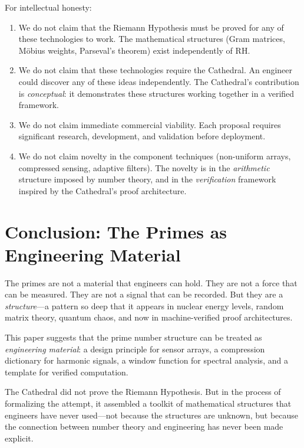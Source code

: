 \documentclass[11pt,a4paper]{article}
\newcommand{\RH}{\ensuremath{\mathrm{RH}}}
\begin{document}
For intellectual honesty:

\begin{enumerate}
  \item We do not claim that the Riemann Hypothesis must be proved
    for any of these technologies to work. The mathematical
    structures (Gram matrices, M\"obius weights, Parseval's theorem)
    exist independently of \RH.
  \item We do not claim that these technologies require the
    Cathedral. An engineer could discover any of these ideas
    independently. The Cathedral's contribution is
    \emph{conceptual}: it demonstrates these structures working
    together in a verified framework.
  \item We do not claim immediate commercial viability. Each
    proposal requires significant research, development, and
    validation before deployment.
  \item We do not claim novelty in the component techniques
    (non-uniform arrays, compressed sensing, adaptive filters).
    The novelty is in the \emph{arithmetic} structure imposed by
    number theory, and in the \emph{verification} framework
    inspired by the Cathedral's proof architecture.
\end{enumerate}

\section{Conclusion: The Primes as Engineering Material}

The primes are not a material that engineers can hold. They are not
a force that can be measured. They are not a signal that can be
recorded. But they are a \emph{structure}---a pattern so deep that
it appears in nuclear energy levels, random matrix theory, quantum
chaos, and now in machine-verified proof architectures.

This paper suggests that the prime number structure can be treated
as \emph{engineering material}: a design principle for sensor
arrays, a compression dictionary for harmonic signals, a window
function for spectral analysis, and a template for verified
computation.

The Cathedral did not prove the Riemann Hypothesis. But in the
process of formalizing the attempt, it assembled a toolkit of
mathematical structures that engineers have never used---not
because the structures are unknown, but because the connection
between number theory and engineering has never been made explicit.
\end{document}
